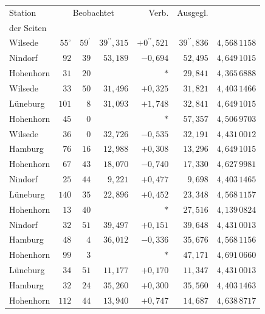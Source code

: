 \begin{center}\small\setlength{\tabcolsep}{5pt}\renewcommand{\arraystretch}{1.04}
\begin{tabular}{|l|r@{\;}r@{\;}r|r|r|c|}\hline
Station & \multicolumn{3}{c|}{Beobachtet} & Verb. & Ausgegl. & \shortstack{\rule{0pt}{2.4ex}Log.\\der Seiten}\\\hline
Wilsede & $55^{\circ}$ & $59^{\prime}$ & $39^{\prime\prime}{,}315$ & $+0^{\prime\prime}{,}521$ & $39^{\prime\prime}{,}836$ & $4{,}568\,1158$\\
Nindorf & $92$ & $39$ & $53{,}189$ & $-0{,}694$ & $52{,}495$ & $4{,}649\,1015$\\
Hohenhorn & $31$ & $20$ &  & $*$ & $29{,}841$ & $4{,}365\,6888$\\[3pt]
Wilsede & $33$ & $50$ & $31{,}496$ & $+0{,}325$ & $31{,}821$ & $4{,}403\,1466$\\
Lüneburg & $101$ & $8$ & $31{,}093$ & $+1{,}748$ & $32{,}841$ & $4{,}649\,1015$\\
Hohenhorn & $45$ & $0$ &  & $*$ & $57{,}357$ & $4{,}506\,9703$\\[3pt]
Wilsede & $36$ & $0$ & $32{,}726$ & $-0{,}535$ & $32{,}191$ & $4{,}431\,0012$\\
Hamburg & $76$ & $16$ & $12{,}988$ & $+0{,}308$ & $13{,}296$ & $4{,}649\,1015$\\
Hohenhorn & $67$ & $43$ & $18{,}070$ & $-0{,}740$ & $17{,}330$ & $4{,}627\,9981$\\[3pt]
Nindorf & $25$ & $44$ & $9{,}221$ & $+0{,}477$ & $9{,}698$ & $4{,}403\,1465$\\
Lüneburg & $140$ & $35$ & $22{,}896$ & $+0{,}452$ & $23{,}348$ & $4{,}568\,1157$\\
Hohenhorn & $13$ & $40$ &  & $*$ & $27{,}516$ & $4{,}139\,0824$\\[3pt]
Nindorf & $32$ & $51$ & $39{,}497$ & $+0{,}151$ & $39{,}648$ & $4{,}431\,0013$\\
Hamburg & $48$ & $4$ & $36{,}012$ & $-0{,}336$ & $35{,}676$ & $4{,}568\,1156$\\
Hohenhorn & $99$ & $3$ &  & $*$ & $47{,}171$ & $4{,}691\,0660$\\[3pt]
Lüneburg & $34$ & $51$ & $11{,}177$ & $+0{,}170$ & $11{,}347$ & $4{,}431\,0013$\\
Hamburg & $32$ & $24$ & $35{,}260$ & $+0{,}300$ & $35{,}560$ & $4{,}403\,1463$\\
Hohenhorn & $112$ & $44$ & $13{,}940$ & $+0{,}747$ & $14{,}687$ & $4{,}638\,8717$\\
\end{tabular}\end{center}

